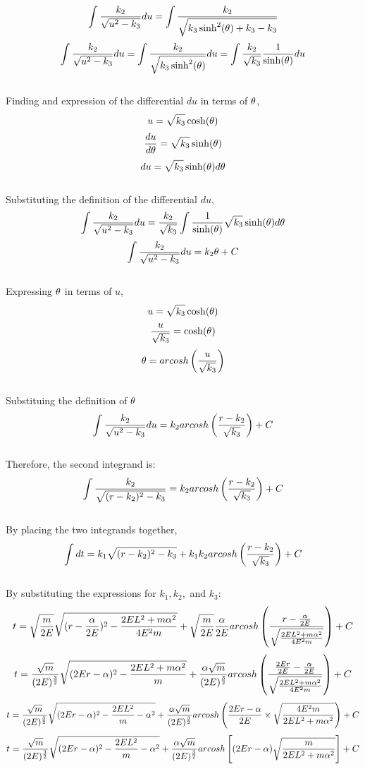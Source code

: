 \documentclass[a4paper, 12pt]{report}
\begin{document}
\begin{center}
$$\int \frac{k_2}{\sqrt{u^2 - k_3}} du = \int \frac{k_2}{\sqrt{k_3\sinh^2(\theta) + k_3 - k_3}}$$
$$\int \frac{k_2}{\sqrt{u^2 - k_3}} du = \int \frac{k_2}{\sqrt{k_3\sinh^2(\theta)}}du = \int \frac{k_2}{\sqrt{k_3}}\frac{1}{\sinh(\theta)}du$$
\\Finding and expression of the differential $du$ in terms of $\theta$,
$$u = \sqrt{k_3}\cosh(\theta)$$
$$\frac{du}{d\theta} = \sqrt{k_3}\sinh(\theta)$$
$$du = \sqrt{k_3}\sinh(\theta)d\theta$$
\\Substituting the definition of the differential $du$,
$$\int \frac{k_2}{\sqrt{u^2 - k_3}} du = \frac{k_2}{\sqrt{k_3}} \int \frac{1}{\sinh(\theta)}\sqrt{k_3}\sinh(\theta)d\theta$$
$$\int \frac{k_2}{\sqrt{u^2 - k_3}} du = k_2 \theta + C$$
\\Expressing $\theta$ in terms of $u$,
$$u = \sqrt{k_3}\cosh(\theta)$$
$$\frac{u}{\sqrt{k_3}} = \cosh(\theta)$$
$$\theta = arcosh\left(\frac{u}{\sqrt{k_3}}\right)$$
\\Substituing the definition of $\theta$
$$\int \frac{k_2}{\sqrt{u^2 - k_3}} du = k_2 arcosh\left(\frac{r - k_2}{\sqrt{k_3}}\right) + C$$
\\Therefore, the second integrand is:
$$\int \frac{k_2}{\sqrt{(r - k_2)^2 - k_3}} = k_2 arcosh\left(\frac{r - k_2}{\sqrt{k_3}}\right) + C$$
\\By placing the two integrands together, 
$$\int dt= k_1 \sqrt{(r - k_2)^2 - k_3} + k_1 k_2 arcosh\left(\frac{r - k_2}{\sqrt{k_3}}\right) + C $$
\\By substituting the expressions for $k_1, k_2,$ and $k_3$:
$$t= \sqrt{\frac{m}{2E}} \sqrt{(r - \frac{\alpha}{2E})^2 - \frac{2E L^2 + m\alpha ^ 2}{4 E^2 m}} + \sqrt{\frac{m}{2E}} \frac{\alpha}{2E} arcosh\left(\frac{r - \frac{\alpha}{2E}}{\sqrt{\frac{2E L^2 + m\alpha ^ 2}{4 E^2 m}}}\right) + C $$
$$t= \frac{\sqrt{m}}{(2E)^\frac{3}{2}} \sqrt{(2Er - \alpha)^2 - \frac{2E L^2 + m\alpha ^ 2}{m}} + \frac{\alpha\sqrt{m}}{(2E)^\frac{3}{2}}  arcosh\left(\frac{\frac{2Er}{2E} - \frac{\alpha}{2E}}{\sqrt{\frac{2E L^2 + m\alpha ^ 2}{4 E^2 m}}}\right) + C $$
$$t= \frac{\sqrt{m}}{(2E)^\frac{3}{2}} \sqrt{(2Er - \alpha)^2 - \frac{2E L^2}{m} - \alpha^2} + \frac{\alpha\sqrt{m}}{(2E)^\frac{3}{2}}  arcosh\left(\frac{2Er - \alpha}{2E} \times \sqrt{\frac{4 E^2 m}{2E L^2 + m\alpha ^ 2}}\right) + C $$
$$t= \frac{\sqrt{m}}{(2E)^\frac{3}{2}} \sqrt{(2Er - \alpha)^2 - \frac{2E L^2}{m} - \alpha^2} + \frac{\alpha\sqrt{m}}{(2E)^\frac{3}{2}}  arcosh\left[(2Er - \alpha)\sqrt{\frac{m}{2E L^2 + m\alpha ^ 2}}  \right] + C $$
\end{center}
\end{document}
